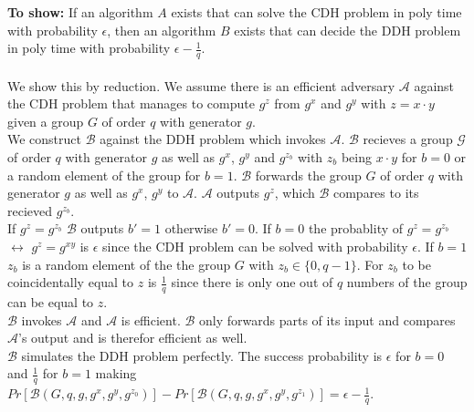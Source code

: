 \textbf{To show:} If an algorithm \(A\) exists that can solve the CDH problem in poly time with probability \(\epsilon\), then an algorithm \(B\) exists that can decide the DDH problem in poly time with probability \(\epsilon - \frac{1}{q}\). \\ \\
We show this by reduction. We assume there is an efficient adversary \(\mathcal{A}\) against the CDH problem that manages to compute \(g^z\) from \(g^x\) and \(g^y\) with \(z = x \cdot y\) given a group \(G\) of order \(q\) with generator \(g\).\\
We construct \(\mathcal{B}\) against the DDH problem which invokes \(\mathcal{A}\). \(\mathcal{B}\) recieves a group \(\mathcal{G}\) of order \(q\) with generator \(g\) as well as \(g^x\), \(g^y\) and \(g^{z_b}\) with \(z_b\) being \(x \cdot y\) for \(b = 0\) or a random element of the group for \(b = 1\). \(\mathcal{B}\) forwards the group \(G\) of order \(q\) with generator \(g\) as well as \(g^x\), \(g^y\) to \(\mathcal{A}\). \(\mathcal{A}\) outputs \(g^z\), which \(\mathcal{B}\) compares to its recieved \(g^{z_b}\).\\
If \(g^z = g^{z_b}\) \(\mathcal{B}\) outputs \(b' = 1\) otherwise \(b' = 0\).  If \(b = 0\) the probablity of \(g^z = g^{z_b}\) \(\leftrightarrow\) \(g^z = g^{xy}\) is \(\epsilon\) since the CDH problem can be solved with probability \(\epsilon\).  If \(b = 1\) \(z_b\) is a random element of the the group \(G\) with \(z_b \in\{0, q-1\}\). For \(z_b\) to be coincidentally equal to \(z\) is \(\frac{1}{q}\) since there is only one out of \(q\) numbers of the group can be equal to \(z\). \\
\(\mathcal{B}\) invokes \(\mathcal{A}\) and \(\mathcal{A}\) is efficient. \(\mathcal{B}\) only forwards parts of its input and compares \(\mathcal{A}\)'s output and is therefor efficient as well.\\
\(\mathcal{B}\) simulates the DDH problem perfectly. The success probability is \(\epsilon\) for \(b = 0\) and \(\frac{1}{q}\) for \(b = 1\) making \(Pr[\mathcal{B}(G, q, g, g^x, g^y, g^{z_0})] - Pr[\mathcal{B}(G, q, g, g^x, g^y, g^{z_1})] = \epsilon - \frac{1}{q}\).\\